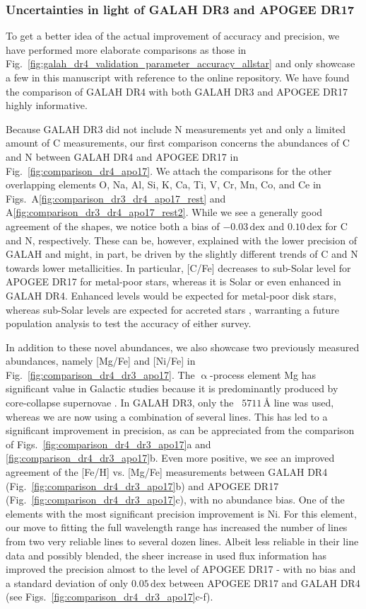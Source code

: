 \documentclass[
  journal=pasa,
  manuscript=research-paper, %
  year=2024,
  volume=37
]{cup-journal}
\newcommand\ion[2]{\text{#1\,\textsc{\lowercase{#2}}}}	%
\newcommand{\dex}{\,\mathrm{dex}}	%
\begin{document}
\subsubsection{Uncertainties in light of GALAH DR3 and APOGEE DR17}

To get a better idea of the actual improvement of accuracy and precision, we have performed more elaborate comparisons as those in Fig.~\ref{fig:galah_dr4_validation_parameter_accuracy_allstar} and only showcase a few in this manuscript with reference to the online repository. We have found the comparison of GALAH DR4 with both GALAH DR3 and APOGEE DR17 highly informative.

Because GALAH DR3 did not include N measurements yet and only a limited amount of C measurements, our first comparison concerns the abundances of C and N between GALAH DR4 and APOGEE DR17 in Fig.~\ref{fig:comparison_dr4_apo17}. We attach the comparisons for the other overlapping elements O, Na, Al, Si, K, Ca, Ti, V, Cr, Mn, Co, and Ce in Figs.~A\ref{fig:comparison_dr3_dr4_apo17_rest} and A\ref{fig:comparison_dr3_dr4_apo17_rest2}. While we see a generally good agreement of the shapes, we notice both a bias of $-0.03\dex$ and $0.10\dex$ for C and N, respectively. These can be, however, explained with the lower precision of GALAH and might, in part, be driven by the slightly different trends of C and N towards lower metallicities. In particular, [C/Fe] decreases to sub-Solar level for APOGEE DR17 for metal-poor stars, whereas it is Solar or even enhanced in GALAH DR4. Enhanced levels would be expected for metal-poor disk stars, whereas sub-Solar levels are expected for accreted stars \citep{Amarsi2019c}, warranting a future population analysis to test the accuracy of either survey.

In addition to these novel abundances, we also showcase two previously measured abundances, namely [Mg/Fe] and [Ni/Fe] in Fig.~\ref{fig:comparison_dr4_dr3_apo17}. The $\upalpha$-process element Mg has significant value in Galactic studies because it is predominantly produced by core-collapse supernovae \citep{Kobayashi2020}. In GALAH DR3, only the \ion{Mg}{i}~$5711\,\text{\AA}$ line was used, whereas we are now using a combination of several lines. This has led to a significant improvement in precision, as can be appreciated from the comparison of Figs.~\ref{fig:comparison_dr4_dr3_apo17}a and \ref{fig:comparison_dr4_dr3_apo17}b. Even more positive, we see an improved agreement of the [Fe/H] vs. [Mg/Fe] measurements between GALAH DR4 (Fig.~\ref{fig:comparison_dr4_dr3_apo17}b) and APOGEE DR17 (Fig.~\ref{fig:comparison_dr4_dr3_apo17}c), with no abundance bias. One of the elements with the most significant precision improvement is Ni. For this element, our move to fitting the full wavelength range has increased the number of lines from two very reliable lines to several dozen lines. Albeit less reliable in their line data and possibly blended, the sheer increase in used flux information has improved the precision almost to the level of APOGEE DR17 - with no bias and a standard deviation of only $0.05\,\mathrm{dex}$ between APOGEE DR17 and GALAH DR4 (see Figs.~\ref{fig:comparison_dr4_dr3_apo17}c-f).
\end{document}
